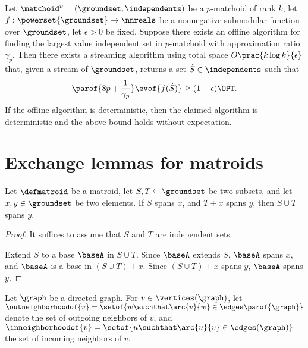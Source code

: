 \documentclass[oneside,letterpaper]{scrartcl} \usepackage{macros}
\begin{document}
\begin{theorem}
  Let $\defpmatchoid$ be a $p$-matchoid of rank $k$, let $f:
  \powerset{\groundset} \to \nnreals$ be a nonnegative submodular
  function over $\groundset$, let $\epsilon > 0$ be fixed. Suppose
  there exists an offline algorithm for finding the largest value
  independent set in $p$-matchoid with approximation ratio $\gamma_p$.
  Then there exists a streaming algorithm using total space
  \begin{math}
    O\prac{k \log k}{\epsilon}
  \end{math} that, given a stream of $\groundset$, returns a set $\bestset \in
  \independents$ such that
  \begin{align*}
    \parof{8p + \frac{1}{\gamma_p}} \evof{f(\bestset)} \geq
    (1-\epsilon) \OPT.
  \end{align*}
  If the offline algorithm is deterministic, then the claimed
  algorithm is deterministic and the above bound holds without
  expectation.
\end{theorem}






\appendix





\section{Exchange lemmas for matroids}

\begin{lemma}
  Let $\defmatroid$ be a matroid, let $S,T \subseteq \groundset$ be
  two subsets, and let $x,y\in \groundset$ be two elements.  If $S$
  spans $x$, and $T + x$ spans $y$, then $S \cup T$ spans $y$.
\end{lemma}
\begin{proof}
  It suffices to assume that $S$ and $T$ are independent sets.

  Extend $S$ to a base $\baseA$ in $S \cup T$. Since $\baseA$ extends
  $S$, $\baseA$ spans $x$, and $\baseA$ is a base in $(S \cup T) +
  x$. Since $(S \cup T) + x$ spans $y$, $\baseA$ spans $y$.
\end{proof}


Let $\graph$ be a directed graph. For $v \in \vertices(\graph)$, let
$\outneighborhoodof{v} = \setof{w \suchthat \arc{v}{w} \in
  \edges\parof{\graph}}$ denote the set of outgoing neighbors of $v$,
and $\inneighborhoodof{v} = \setof{u \suchthat \arc{u}{v} \in
  \edges(\graph)}$ the set of incoming neighbors of $v$.
\end{document}

